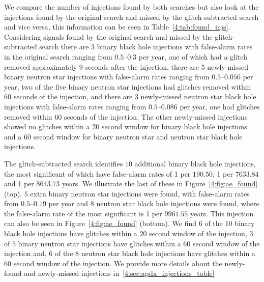 We compare the number of injections found by both searches but also look at the \gwadj injections found by the original search and missed by the glitch-subtracted search and vice versa, this information can be seen in Table~\ref{4:tab:found_injs}. Considering signals found by the original search and missed by the glitch-subtracted search there are $3$ binary black hole injections with false-alarm rates in the original search ranging from $0.5\text{--}0.3$ per year, one of which had a glitch removed approximately $9$ seconds after the injection, there are $5$ newly-missed binary neutron star injections with false-alarm rates ranging from $0.5\text{--}0.056$ per year, two of the five binary neutron star injections had glitches removed within $60$ seconds of the injection, and there are $3$ newly-missed neutron star black hole injections with false-alarm rates ranging from $0.5\text{--}0.086$ per year, one had glitches removed within $60$ seconds of the injection. The other newly-missed injections showed no \scladj glitches within a $20$ second window for binary black hole injections and a $60$ second window for binary neutron star and neutron star black hole injections.

The glitch-subtracted search identifies $10$ additional binary black hole injections, the most significant of which have false-alarm rates of 1 per $190.50$, 1 per $7633.84$ and 1 per $8643.73$ years. We illustrate the last of these in Figure~\ref{4:fig:ae_found} (top). $5$ extra binary neutron star injections were found, with false-alarm rates from $0.5\text{--}0.19$ per year and $8$ neutron star black hole injections were found, where the false-alarm rate of the most significant is 1 per $9961.55$ years. This injection can also be seen in Figure~\ref{4:fig:ae_found} (bottom). We find $6$ of the $10$ binary black hole injections have \scladj glitches within a $20$ second window of the injection, $3$ of $5$ binary neutron star injections have \scladj glitches within a $60$ second window of the injection and, $6$ of the $8$ neutron star black hole injections have \scladj glitches within a $60$ second window of the injection. We provide more details about the newly-found and newly-missed injections in~\ref{4:sec:apdx_injections_table}

